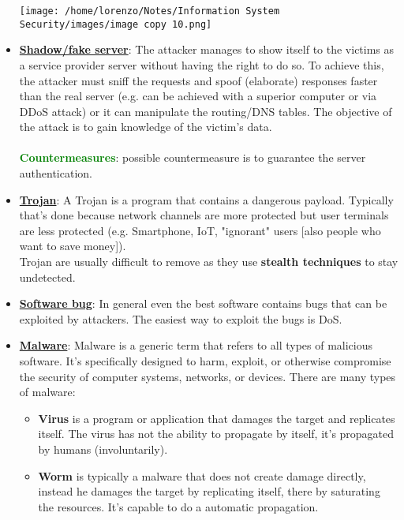 \begin{itemize}
\begin{minipage}{0.6\textwidth}
    \end{minipage} 
    \hspace{0.2cm}
    \begin{minipage}{0.4\textwidth}
        \centering
        \texttt{[image: /home/lorenzo/Notes/Information System Security/images/image copy 10.png]}
    \end{minipage}
\item \underline{\textbf{Shadow/fake server}}: The attacker manages to show itself to the victims as a service provider server without having the right to do so. To achieve this, the attacker must sniff the requests and spoof (elaborate) responses faster than the real server (e.g. can be achieved with a superior computer or via DDoS attack) or it can manipulate the routing/DNS tables. The objective of the attack is to gain knowledge of the victim’s data.\\ 
\\  
\textcolor{green}{\textbf{Countermeasures}}:  possible countermeasure is to guarantee the server authentication.
\item \underline{\textbf{Trojan}}: A Trojan is a program that contains a dangerous payload. Typically that’s done because network channels are more protected but user terminals are less protected
(e.g. Smartphone, IoT, "ignorant" users [also people who want to save money]).\\ Trojan are usually difficult to remove as they use \textbf{stealth techniques} to stay undetected.
\item \underline{\textbf{Software bug}}: In general even the best software contains bugs that can be exploited by attackers. The easiest way to exploit the bugs is DoS.
\item \underline{\textbf{Malware}}: Malware is a generic term that refers to all types of malicious software. It's specifically designed to harm, exploit, or otherwise compromise the security of computer systems, networks, or devices. There are many types of malware:
\begin{itemize}
    \item \textbf{Virus} is a program or application that damages the target and replicates itself. The virus has not the ability to propagate by itself, it's propagated by humans (involuntarily).
    \item \textbf{Worm} is typically a malware that does not create damage directly, instead he damages the target by replicating itself, there by saturating the resources. It's capable to do a automatic propagation.

\end{itemize}
\end{itemize}
